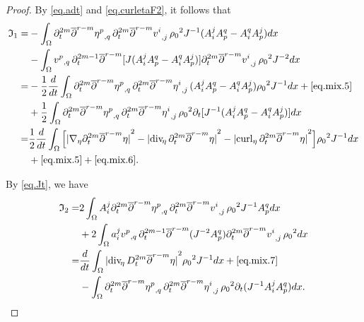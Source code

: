 \documentclass[12pt,twoside,reqno]{amsart}
\numberwithin{equation}{section}
\theoremstyle{definition}
\theoremstyle{remark}
\begin{document}
\begin{proof}
By \eqref{eq.adt} and \eqref{eq.curletaF2}, it follows that
\begin{align}
  {\mathfrak{I}}_1=&-\int_\Omega {\partial}_t^{2m}{\overline{\partial}}^{r-m}{{{\eta^p}}_{,{q}}\,}{{{{\partial}_t^{2m}{\overline{\partial}}^{r-m} v^i}}_{,{j}}\,} {\rho_0}^2 J^{-1}(A^j_iA^q_p-A^q_iA^j_p)dx{\nonumber}\\
  &-\int_\Omega {{{v^p}}_{,{q}}\,}{\partial}_t^{2m-1}{\overline{\partial}}^{r-m}[J(A^j_iA^q_p-A^q_iA^j_p)]{{{{\partial}_t^{2m}{\overline{\partial}}^{r-m} v^i}}_{,{j}}\,} {\rho_0}^2 J^{-2}dx\label{eq.mix.5}\\
  =&-\frac{1}{2}\frac{d}{dt}\int_\Omega {\partial}_t^{2m}{\overline{\partial}}^{r-m}{{{\eta^p}}_{,{q}}\,}{{{{\partial}_t^{2m}{\overline{\partial}}^{r-m} \eta^i}}_{,{j}}\,}(A^j_iA^q_p-A^q_iA^j_p) {\rho_0}^2 J^{-1}dx+\eqref{eq.mix.5}{\nonumber}\\
  &+\frac{1}{2}\int_\Omega {\partial}_t^{2m}{\overline{\partial}}^{r-m}{{{\eta^p}}_{,{q}}\,}{{{{\partial}_t^{2m}{\overline{\partial}}^{r-m} \eta^i}}_{,{j}}\,} {\rho_0}^2 {\partial}_t[J^{-1}(A^j_iA^q_p-A^q_iA^j_p)]dx\label{eq.mix.6}\\
  =&\frac{1}{2}\frac{d}{dt}\int_\Omega \Big[{\vert{{\nabla}_\eta {\partial}_t^{2m}{\overline{\partial}}^{r-m} \eta}\vert}^2-{\vert{{\mathrm{div}_{\!\eta}\,} {\partial}_t^{2m}{\overline{\partial}}^{r-m} \eta}\vert}^2-{\vert{{\mathrm{curl}_\eta\,} {\partial}_t^{2m}{\overline{\partial}}^{r-m} \eta}\vert}^2\Big]{\rho_0}^2 J^{-1}dx{\nonumber}\\
  &+\eqref{eq.mix.5}+\eqref{eq.mix.6}.{\nonumber}
\end{align}

By \eqref{eq.Jt}, we have
\begin{align}
  {\mathfrak{I}}_2=&2\int_\Omega  A^j_i {\partial}_t^{2m}{\overline{\partial}}^{r-m}{{{\eta^p}}_{,{q}}\,}{{{{\partial}_t^{2m}{\overline{\partial}}^{r-m} v^i}}_{,{j}}\,} {\rho_0}^2  J^{-1}A^q_p dx{\nonumber}\\
  &+2\int_\Omega  a^j_i{{{v^p}}_{,{q}}\,} {\partial}_t^{2m-1}{\overline{\partial}}^{r-m}(J^{-2}A^q_p){{{{\partial}_t^{2m}{\overline{\partial}}^{r-m} v^i}}_{,{j}}\,} {\rho_0}^2  dx\label{eq.mix.7}\\
  =&\frac{d}{dt}\int_\Omega {\vert{{\mathrm{div}_{\!\eta}\,} D_t^{2m}{\overline{\partial}}^{r-m} \eta}\vert}^2{\rho_0}^2  J^{-1}dx+\eqref{eq.mix.7}{\nonumber}\\
  &-\int_\Omega  {\partial}_t^{2m}{\overline{\partial}}^{r-m}{{{\eta^p}}_{,{q}}\,}{{{{\partial}_t^{2m}{\overline{\partial}}^{r-m} \eta^i}}_{,{j}}\,} {\rho_0}^2  {\partial}_t(J^{-1}A^j_i A^q_p) dx.\label{eq.mix.8}
\end{align}


\end{proof}
\end{document}
